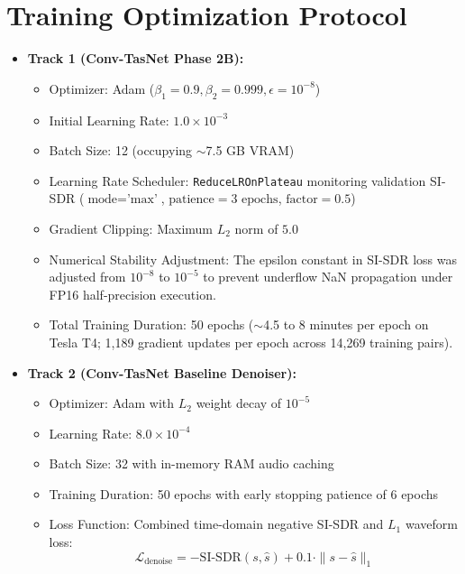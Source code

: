 \documentclass[11pt,a4paper]{report}
\begin{document}
\section{Training Optimization Protocol}
\begin{itemize}
    \item \textbf{Track 1 (Conv-TasNet Phase 2B):}
    \begin{itemize}
        \item Optimizer: Adam ($\beta_1 = 0.9, \beta_2 = 0.999, \epsilon = 10^{-8}$)
        \item Initial Learning Rate: $1.0 \times 10^{-3}$
        \item Batch Size: 12 (occupying $\sim$7.5 GB VRAM)
        \item Learning Rate Scheduler: \texttt{ReduceLROnPlateau} monitoring validation SI-SDR ($\text{mode} = \text{'max'}$, $\text{patience} = 3\text{ epochs}$, $\text{factor} = 0.5$)
        \item Gradient Clipping: Maximum $L_2$ norm of $5.0$
        \item Numerical Stability Adjustment: The epsilon constant in SI-SDR loss was adjusted from $10^{-8}$ to $10^{-5}$ to prevent underflow NaN propagation under FP16 half-precision execution.
        \item Total Training Duration: 50 epochs ($\sim$4.5 to 8 minutes per epoch on Tesla T4; 1,189 gradient updates per epoch across 14,269 training pairs).
    \end{itemize}
    \item \textbf{Track 2 (Conv-TasNet Baseline Denoiser):}
    \begin{itemize}
        \item Optimizer: Adam with $L_2$ weight decay of $10^{-5}$
        \item Learning Rate: $8.0 \times 10^{-4}$
        \item Batch Size: 32 with in-memory RAM audio caching
        \item Training Duration: 50 epochs with early stopping patience of 6 epochs
        \item Loss Function: Combined time-domain negative SI-SDR and $L_1$ waveform loss:
        \begin{equation}
            \mathcal{L}_{\text{denoise}} = -\text{SI-SDR}(s, \hat{s}) + 0.1 \cdot \|s - \hat{s}\|_1
        \end{equation}
    \end{itemize}
\end{itemize}
\end{document}
